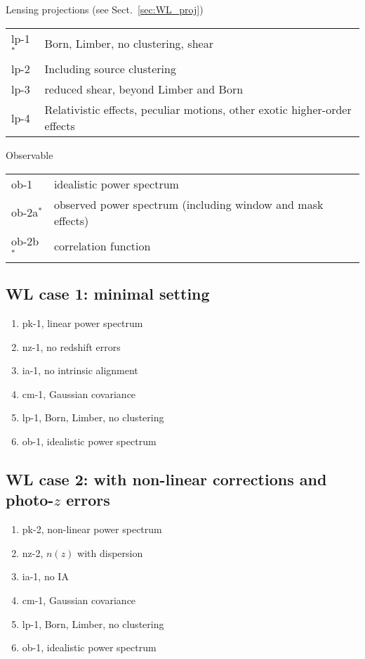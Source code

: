 \begin{table}
Lensing projections (see Sect.~\ref{sec:WL_proj})

\begin{tabular}{ll} \hline\hline
lp-1$^\ast$ & Born, Limber, no clustering, shear \\
lp-2 & Including source clustering \\
lp-3 & reduced shear, beyond Limber and Born \\
lp-4 & Relativistic effects, peculiar motions, other exotic higher-order effects \\
\hline\hline
\end{tabular}
\bigskip \bigskip

Observable

\begin{tabular}{ll} \hline\hline
ob-1  & idealistic power spectrum \\
ob-2a$^\ast$ & observed power spectrum (including window and mask effects) \\
ob-2b$^\ast$ & correlation function \\
\hline\hline
\end{tabular}
\bigskip \bigskip


\end{table}

\subsection*{WL case 1: minimal setting}

\begin{enumerate}
\setlength{\itemsep}{0pt}\setlength{\parskip}{0pt}
\item pk-1, linear power spectrum
\item nz-1, no redshift errors
\item ia-1, no intrinsic alignment
\item cm-1, Gaussian covariance
\item lp-1, Born, Limber, no clustering
\item ob-1, idealistic power spectrum
\end{enumerate}

\subsection*{WL case 2: with non-linear corrections and photo-$z$ errors}

\begin{enumerate}
\setlength{\itemsep}{0pt}\setlength{\parskip}{0pt}
\item pk-2, non-linear power spectrum
\item nz-2, $n(z)$ with dispersion
\item ia-1, no IA
\item cm-1, Gaussian covariance
\item lp-1, Born, Limber, no clustering
\item ob-1, idealistic power spectrum
\end{enumerate}

